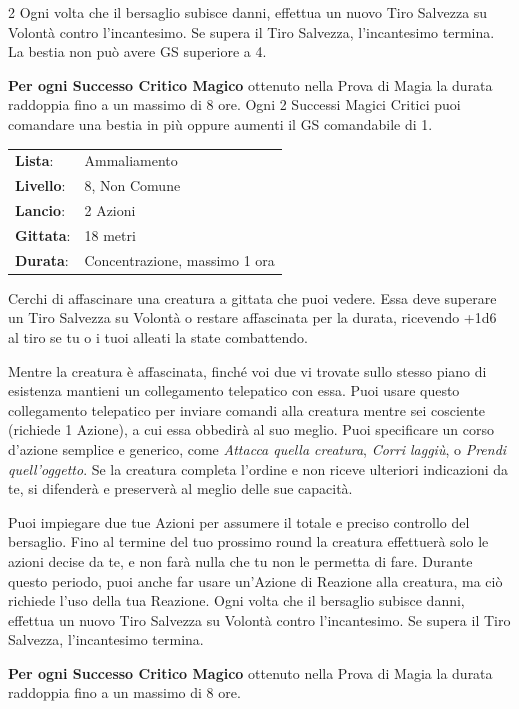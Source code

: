 \begin{multicols}{2}
Ogni volta che il bersaglio subisce danni, effettua un nuovo Tiro Salvezza su Volontà contro l'incantesimo. Se supera il Tiro Salvezza, l'incantesimo termina. La bestia non può avere GS superiore a 4.

\textbf{Per ogni Successo Critico Magico} ottenuto nella Prova di Magia la durata raddoppia fino a un massimo di 8 ore. Ogni 2 Successi Magici Critici puoi comandare una bestia in più oppure aumenti il GS comandabile di 1.

\noindent\begin{tabularx}{\linewidth}{p{1.9cm}X}
	\rowcolor{gray!20}\textbf{Lista}: & Ammaliamento \\
	\textbf{Livello}: & 8, Non Comune \\
	\rowcolor{gray!20}\textbf{Lancio}: & 2 Azioni \\
	\textbf{Gittata}: & 18 metri \\
	\rowcolor{gray!20}\textbf{Durata}: & Concentrazione, massimo 1 ora \\
\end{tabularx}\smallskip

Cerchi di affascinare una creatura a gittata che puoi vedere. Essa deve superare un Tiro Salvezza su Volontà o restare affascinata per la durata, ricevendo +1d6 al tiro se tu o i tuoi alleati la state combattendo.

Mentre la creatura è affascinata, finché voi due vi trovate sullo stesso piano di esistenza mantieni un collegamento telepatico con essa. Puoi usare questo collegamento telepatico per inviare comandi alla creatura mentre sei cosciente (richiede 1 Azione), a cui essa obbedirà al suo meglio. Puoi specificare un corso d'azione semplice e generico, come \emph{Attacca quella creatura}, \emph{Corri laggiù}, o \emph{Prendi quell'oggetto}. Se la creatura completa l'ordine e non riceve ulteriori indicazioni da te, si difenderà e preserverà al meglio delle sue capacità.

Puoi impiegare due tue Azioni per assumere il totale e preciso controllo del bersaglio. Fino al termine del tuo prossimo round la creatura effettuerà solo le azioni decise da te, e non farà nulla che tu non le permetta di fare. Durante questo periodo, puoi anche far usare un'Azione di Reazione alla creatura, ma ciò richiede l'uso della tua Reazione. Ogni volta che il bersaglio subisce danni, effettua un nuovo Tiro Salvezza su Volontà contro l'incantesimo. Se supera il Tiro Salvezza, l'incantesimo termina.

\textbf{Per ogni Successo Critico Magico} ottenuto nella Prova di Magia la durata raddoppia fino a un massimo di 8 ore.


\end{multicols}
